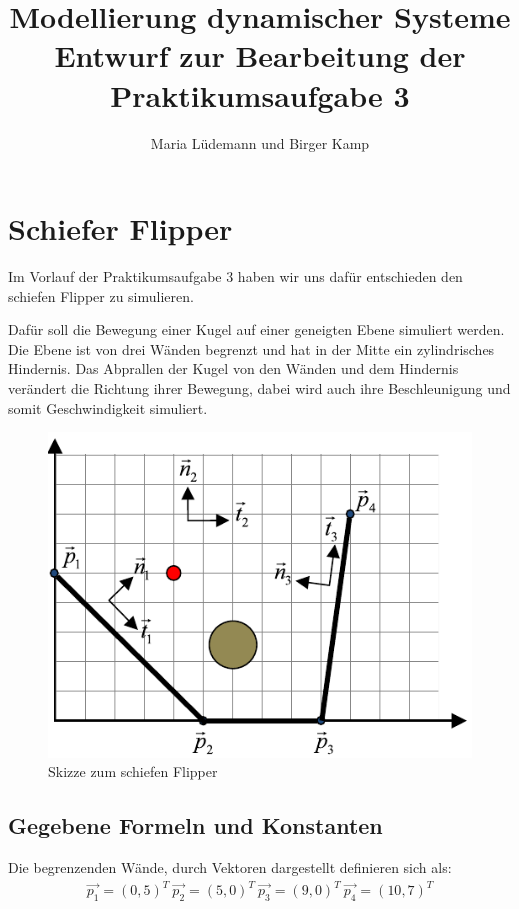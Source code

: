 \documentclass[]{scrartcl}
\title{Modellierung dynamischer Systeme  \\ Entwurf zur Bearbeitung der Praktikumsaufgabe 3}
\author{Maria Lüdemann und Birger Kamp}
\begin{document}
\maketitle

\begin{abstract}

\end{abstract}

\section{Schiefer Flipper}
Im Vorlauf der Praktikumsaufgabe 3 haben wir uns dafür entschieden den schiefen Flipper zu simulieren.

Dafür soll die Bewegung einer Kugel auf einer geneigten Ebene simuliert werden. Die Ebene ist von drei Wänden begrenzt und hat in der Mitte ein zylindrisches Hindernis. Das Abprallen der Kugel von den Wänden und dem Hindernis verändert die Richtung ihrer Bewegung, dabei wird auch ihre Beschleunigung und somit Geschwindigkeit simuliert.


\begin{figure}[H]
\centering
\includegraphics[width=0.8\linewidth]{./skizze_schieferFlipper}
\caption{Skizze zum schiefen Flipper}
\label{fig:1_skizze_schieferFlipper}
\end{figure}


\subsection{Gegebene Formeln und Konstanten}
Die begrenzenden Wände, durch Vektoren dargestellt definieren sich als:
\begin{align}
\vec{p_1} = (0,5)^T \ 
\vec{p_2} = (5,0)^T \ 
\vec{p_3} = (9,0)^T \ 
\vec{p_4} = (10,7)^T
\end{align}
\end{document}
